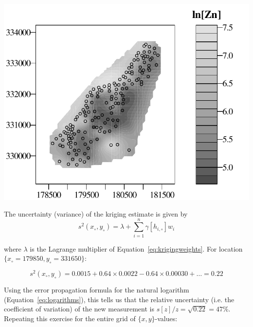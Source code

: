 \noindent\begin{minipage}[t][][b]{.6\textwidth}
\includegraphics[width=\textwidth]{../figures/meusecontour.pdf}\\
\end{minipage}
\begin{minipage}[t][][t]{.39\textwidth}
  \label{fig:meusecontour}
\end{minipage}

The uncertainty (variance) of the kriging estimate is given by
\begin{equation}
  s^2(x_\circ,y_\circ) = \lambda + \sum\limits_{i=1}^n \gamma[h_{i,\circ}] w_i
  \label{eq:kriginvar}
\end{equation}

\noindent where $\lambda$ is the Lagrange multiplier of
Equation~\ref{eq:krigingweights}. For location
$\{x_\circ=179850,y_\circ=331650\}$:

\[
s^2(x_\circ,y_\circ) = 0.0015 + 0.64 \times 0.0022 - 0.64 \times
0.00030 + \ldots = 0.22
\]

Using the error propagation formula for the natural logarithm
(Equation~\ref{eq:logarithms}), this tells us that the relative
uncertainty (i.e. the coefficient of variation) of the new measurement
is $s[z]/z=\sqrt{0.22}=47$\%. Repeating this exercise for the entire
grid of $\{x,y\}$-values:

